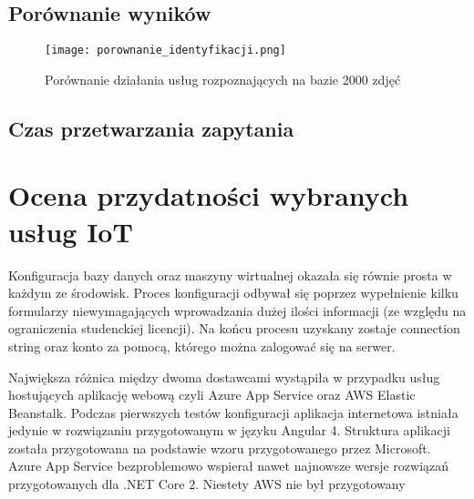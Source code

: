 \subsection{Porównanie wyników}
\begin{figure}[H]
	\centering
	\texttt{[image: porownanie\_identyfikacji.png]}
	\caption{Porównanie działania usług rozpoznających na bazie 2000 zdjęć}
	\label{fig:porownanie_identyfikator}
\end{figure}


\subsection{Czas przetwarzania zapytania}

\section{Ocena przydatności wybranych usług IoT}



Konfiguracja bazy danych oraz maszyny wirtualnej okazała się równie prosta w każdym ze środowisk. Proces konfiguracji odbywał się poprzez wypełnienie kilku formularzy niewymagających wprowadzania dużej ilości informacji (ze względu na ograniczenia studenckiej licencji). Na końcu procesu uzyskany zostaje connection string oraz konto za pomocą, którego można zalogować się na serwer.

Największa różnica między dwoma dostawcami wystąpiła w przypadku usług hostujących aplikację webową czyli Azure App Service oraz AWS Elastic Beanstalk. Podczas pierwszych testów konfiguracji aplikacja internetowa istniała jedynie w rozwiązaniu przygotowanym w języku Angular 4. Struktura aplikacji została przygotowana na podstawie wzoru przygotowanego przez Microsoft. Azure App Service bezproblemowo wspierał nawet najnowsze wersje rozwiązań przygotowanych dla .NET Core 2. Niestety AWS nie był przygotowany 